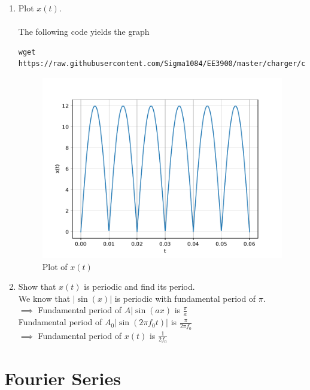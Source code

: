 \documentclass[journal,12pt,twocolumn]{IEEEtran}
\renewcommand\thesection{\arabic{section}}
\begin{document}
\begin{enumerate}[label=\thesection.\arabic*, ref=\thesection.\theenumi]

\item Plot $x(t)$. \\
	\solution\\
	The following code yields the graph
	\begin{lstlisting}
wget https://raw.githubusercontent.com/Sigma1084/EE3900/master/charger/codes/Ex1_1_plotxt.py
	\end{lstlisting}
	\begin{figure}[!htp]
		\includegraphics[width=\columnwidth]{figs/Ex1_1_xt}
		\caption{Plot of $x(t)$}
		\label{fig:x-t}
	\end{figure}


\item Show that $x(t)$ is periodic and find its period.
	\solution\\
	We know that \( |\sin(x)| \) is periodic with fundamental period of \( \pi \). \\
	\( \implies \) Fundamental period of \( A|\sin(ax) \) is \( \frac{\pi}{a} \) \\
	Fundamental period of \( A_0|\sin(2\pi f_0 t)| \) is \( \frac{\pi}{2\pi f_0} \) \\
	\( \implies \) Fundamental period of \( x(t) \) is \( \frac{1}{2f_0} \)
	

\end{enumerate}


\section{Fourier Series}
\end{document}
